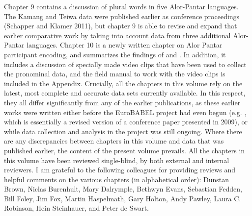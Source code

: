 \documentclass[output=paper]{LSP/langsci}
\begin{document}
	Chapter 9 contains a discussion of plural words in five Alor-Pantar languages. The Kamang and Teiwa data were published earlier as conference proceedings (Schapper and Klamer 2011), but chapter 9 is able to revise and expand that earlier comparative work by taking into account data from three additional Alor-Pantar languages.
	Chapter 10 is a newly written chapter on Alor Pantar participant encoding, and summarizes the findings of \citet{FeddenEtAl2013} and \citet{FeddenEtAl2014}. In addition, it includes a discussion of specially made video clips that have been used to collect the pronominal data, and the field manual to work with the video clips is included in the Appendix.
	Crucially, all the chapters in this volume rely on the latest, most complete and accurate data sets currently available. In this respect, they all differ significantly from any of the earlier publications, as these earlier works were written either before the EuroBABEL project had even begun (e.g. \citet{HoltonEtAl2012}, which is essentially a revised version of a conference paper presented in 2009), or while data collection and analysis in the project was still ongoing. Where there are any discrepancies between chapters in this volume and data that was published earlier, the content of the present volume prevails.
	All the chapters in this volume have been reviewed single-blind, by both external and internal reviewers. I am grateful to the following colleagues for providing reviews and helpful comments on the various chapters (in alphabetical order): Dunstan Brown, Niclas Burenhult, Mary Dalrymple, Bethwyn Evans, Sebastian Fedden, Bill Foley, Jim Fox, Martin Haspelmath, Gary Holton, Andy Pawley, Laura C. Robinson, Hein Steinhauer, and Peter de Swart.
	
\printbibliography[heading=subbibliography,notkeyword=this]
\end{document}
